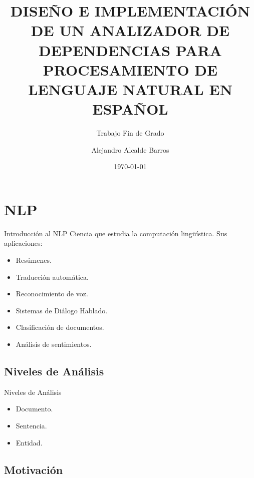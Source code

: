\documentclass[utf8,draft]{beamer}
\institute{ETSIIT}
\date{\today}
\subtitle{Trabajo Fin de Grado} %
\title{DISEÑO E IMPLEMENTACIÓN DE UN ANALIZADOR DE DEPENDENCIAS PARA PROCESAMIENTO DE LENGUAJE NATURAL EN ESPAÑOL} %
\author{Alejandro Alcalde Barros}
\begin{document}
\frame{\maketitle}

  \section{NLP}
  
  \begin{frame}{Introducción al NLP}
    Ciencia que estudia la computación lingüística.
    Sus aplicaciones:
    \begin{itemize}
    \item Resúmenes.
    \item Traducción automática.
    \item Reconocimiento de voz.
    \item Sistemas de Diálogo Hablado.
    \item Clasificación de documentos.
    \item Análisis de sentimientos.
    \end{itemize}
  \end{frame}

  \subsection*{Niveles de Análisis}
  
  \begin{frame}{Niveles de Análisis}
    \begin{itemize}
    \item Documento.
    \item Sentencia.
    \item Entidad.
    \end{itemize}
  \end{frame}

  \newcommand*{\checktikz}[1][]{\tikz[x=1em, y=1em]\fill[#1] (0,.35) -- (.25,0) --
      (1,.7) -- (.25,.15) -- cycle;}
  \newcommand*{\ccheck}{\checktikz[tick,rounded corners=.5pt, draw=tick,
      thin]} %

  \subsection*{Motivación}
  
\end{document}
